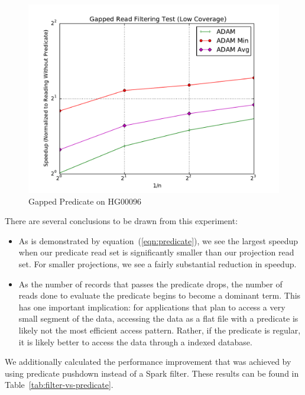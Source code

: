 \documentclass[10pt,twocolumn]{article}
\theoremstyle{plain}
\begin{document}
\begin{figure}[h]
\begin{center}
\includegraphics[width=\linewidth]{microbenchmarks/gapped_predicate_low_coverage.pdf}
\end{center}
\caption{Gapped Predicate on HG00096}
\label{fig:gapped-filter}
\end{figure}

There are several conclusions to be drawn from this experiment:

\begin{itemize}
\item As is demonstrated by equation~(\ref{eqn:predicate}), we see the largest speedup when our predicate read set is significantly
smaller than our projection read set. For smaller projections, we see a fairly substantial reduction in speedup.
\item As the number of records that passes the predicate drops, the number of reads done to evaluate the predicate begins to become
a dominant term. This has one important implication: for applications that plan to access a very small segment of the data, accessing the
data as a flat file with a predicate is likely not the most efficient access pattern. Rather, if the predicate is regular, it is likely better to access
the data through a indexed database.
\end{itemize}

We additionally calculated the performance improvement that was achieved by using predicate pushdown instead of a Spark filter.
These results can be found in Table~\ref{tab:filter-vs-predicate}.
\end{document}
